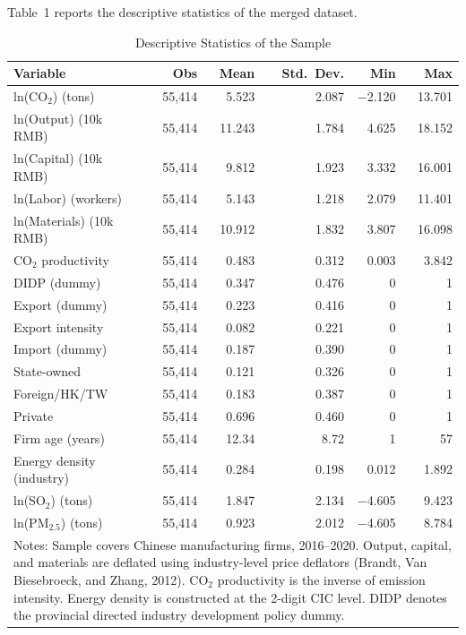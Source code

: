 \documentclass[11pt,a4paper]{article}
\begin{document}
Table~1 reports the descriptive statistics of the merged dataset.

\begin{table}[htbp]
\centering
\caption{Descriptive Statistics of the Sample}
\label{tab:descriptive}
\begin{tabular}{lrrrrr}
\toprule
Variable & Obs & Mean & Std.\ Dev. & Min & Max \\
\midrule
ln(CO$_2$) (tons)         & 55{,}414 & 5.523  & 2.087 & $-$2.120 & 13.701 \\
ln(Output) (10k RMB)      & 55{,}414 & 11.243 & 1.784 & 4.625    & 18.152 \\
ln(Capital) (10k RMB)     & 55{,}414 & 9.812  & 1.923 & 3.332    & 16.001 \\
ln(Labor) (workers)       & 55{,}414 & 5.143  & 1.218 & 2.079    & 11.401 \\
ln(Materials) (10k RMB)   & 55{,}414 & 10.912 & 1.832 & 3.807    & 16.098 \\
CO$_2$ productivity       & 55{,}414 & 0.483  & 0.312 & 0.003    & 3.842  \\
DIDP (dummy)              & 55{,}414 & 0.347  & 0.476 & 0        & 1      \\
Export (dummy)            & 55{,}414 & 0.223  & 0.416 & 0        & 1      \\
Export intensity          & 55{,}414 & 0.082  & 0.221 & 0        & 1      \\
Import (dummy)            & 55{,}414 & 0.187  & 0.390 & 0        & 1      \\
State-owned               & 55{,}414 & 0.121  & 0.326 & 0        & 1      \\
Foreign/HK/TW             & 55{,}414 & 0.183  & 0.387 & 0        & 1      \\
Private                   & 55{,}414 & 0.696  & 0.460 & 0        & 1      \\
Firm age (years)          & 55{,}414 & 12.34  & 8.72  & 1        & 57     \\
Energy density (industry) & 55{,}414 & 0.284  & 0.198 & 0.012    & 1.892  \\
ln(SO$_2$) (tons)         & 55{,}414 & 1.847  & 2.134 & $-$4.605 & 9.423  \\
ln(PM$_{2.5}$) (tons)     & 55{,}414 & 0.923  & 2.012 & $-$4.605 & 8.784  \\
\bottomrule
\multicolumn{6}{p{0.9\textwidth}}{\footnotesize Notes: Sample covers Chinese manufacturing firms, 2016--2020. Output, capital, and materials are deflated using industry-level price deflators (Brandt, Van Biesebroeck, and Zhang, 2012). CO$_2$ productivity is the inverse of emission intensity. Energy density is constructed at the 2-digit CIC level. DIDP denotes the provincial directed industry development policy dummy.}
\end{tabular}
\end{table}
\end{document}
